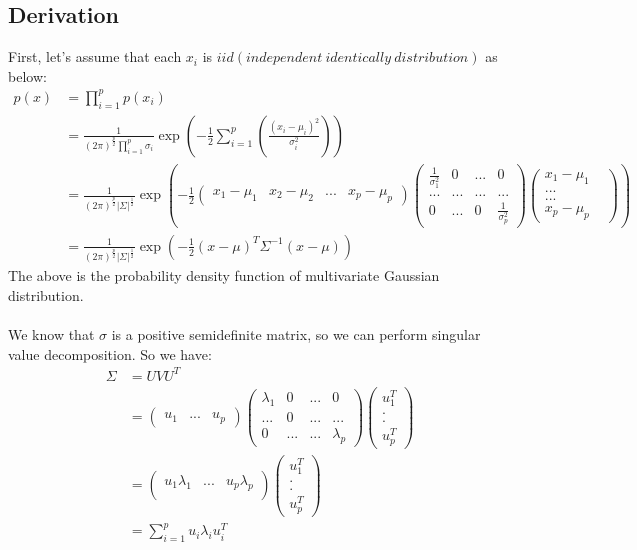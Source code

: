 \documentclass{report}
\begin{document}
\subsection{Derivation}
First, let's assume that each $x_i$ is $iid (independent\ identically\ distribution)$ as below:
$$
\begin{aligned}
p(x)
&=\prod_{i=1}^p p(x_i)\\
&=\frac{1}{(2\pi)^{\frac{p}{2}}\prod_{i=1}^p \sigma_i} \exp(-\frac{1}{2}\sum_{i=1}^p (\frac{(x_i-\mu_i)^2}{\sigma_i^2}))\\
&=\frac{1}{(2\pi)^{\frac{p}{2}}|\Sigma|^{\frac{1}{2}}} \exp(-\frac{1}{2}
\left (
\begin{matrix}
x_1-\mu_1 & x_2-\mu_2 & ... & x_p - \mu_p
\end{matrix}
\right )
\left (
\begin{matrix}
\frac{1}{\sigma_1^2} & 0 & ... & 0 \\
... & ... & ... & ... \\
0 & ... & 0 & \frac{1}{\sigma_p^2}
\end{matrix}
\right )
\left (
\begin{matrix}
x_1-\mu_1\\
...&\\
...&\\
x_p-\mu_p
\end{matrix}
\right ))\\
&=\frac{1}{(2\pi)^{\frac{p}{2}}|\Sigma|^{\frac{1}{2}}} \exp(-\frac{1}{2}(x-\mu)^T \Sigma^{-1}(x-\mu))
\end{aligned}
\label{Gau.pdf}
$$
The above is the probability density function of multivariate Gaussian distribution.\\\\
We know that $\sigma$ is a positive semidefinite matrix, so we can perform singular value decomposition. So we have:
$$
\begin{aligned}
\Sigma
&=UVU^T\\
&=
\left ( \begin{matrix}
u_1 & ... & u_p
\end{matrix} \right )
\left ( \begin{matrix}
\lambda_1 & 0 & ... & 0\\
... & 0 & ... & ...\\
0 & ... & ... & \lambda_p
\end{matrix} \right )
\left ( \begin{matrix}
u_1^T \\
.\\
.\\
u_p^T
\end{matrix} \right )\\
&=
\left ( \begin{matrix}
u_1\lambda_1 & ... & u_p \lambda_p\\
\end{matrix} \right )
\left ( \begin{matrix}
u_1^T\\
.\\
.\\
u_p^T
\end{matrix} \right )\\
&=\sum_{i=1}^p u_i\lambda_i u_i^T
\end{aligned}
$$
\end{document}
